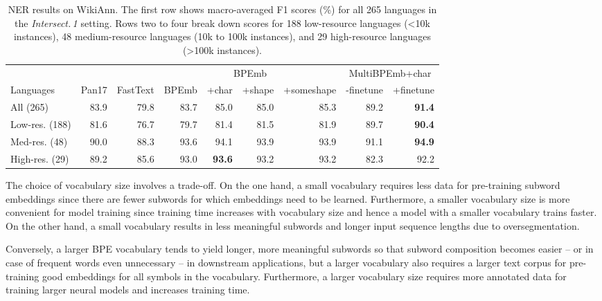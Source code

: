 \documentclass[11pt,a4paper]{article}
\begin{document}
\begin{table*}[t!]
	\centering
	\small
	\begin{adjustbox}{max width=\linewidth}
		\begin{tabular}{lrr|rrrr|rr}
\toprule

 & & & \multicolumn{4}{|c|}{BPEmb} & \multicolumn{2}{|c}{MultiBPEmb+char} \\
Languages & Pan17 & FastText & BPEmb & +char & +shape & +someshape & -finetune & +finetune \\

\midrule
All (265) & 83.9 & 79.8 & 83.7 & 85.0 & 85.0 & 85.3 & 89.2 & \textbf{91.4}\\
Low-res. (188) & 81.6 & 76.7 & 79.7 & 81.4 & 81.5 & 81.9 & 89.7 & \textbf{90.4}\\
Med-res. (48) & 90.0 & 88.3 & 93.6 & 94.1 & 93.9 & 93.9 & 91.1 & \textbf{94.9}\\
High-res. (29) & 89.2 & 85.6 & 93.0 & \textbf{93.6} & 93.2 & 93.2 & 82.3 & 92.2\\
\bottomrule
\end{tabular}
 	\end{adjustbox}
	\caption{NER results on WikiAnn. The first row shows macro-averaged F1 scores (\%) for all 265 languages in the \emph{Intersect.\,1} setting. Rows two to four break down scores for 188 low-resource languages (\textless10k instances), 48 medium-resource languages (10k to 100k instances), and 29 high-resource languages (\textgreater100k instances).}
	\label{tbl:wikiann-results-all}
\end{table*}

The choice of vocabulary size involves a trade-off.
On the one hand, a small vocabulary requires less data for pre-training subword embeddings since there are fewer subwords for which embeddings need to be learned.
Furthermore, a smaller vocabulary size is more convenient for model training since training time increases with vocabulary size \citep{morin2005hierarchical} and hence a model with a smaller vocabulary trains faster.
On the other hand, a small vocabulary results in less meaningful subwords and longer input sequence lengths due to oversegmentation.

Conversely, a larger BPE vocabulary tends to yield longer, more meaningful subwords so that subword composition becomes easier -- or in case of frequent words even unnecessary -- in downstream applications, but a larger vocabulary also requires a larger text corpus for pre-training good embeddings for all symbols in the vocabulary.
Furthermore, a larger vocabulary size requires more annotated data for training larger neural models and increases training time.
\end{document}
